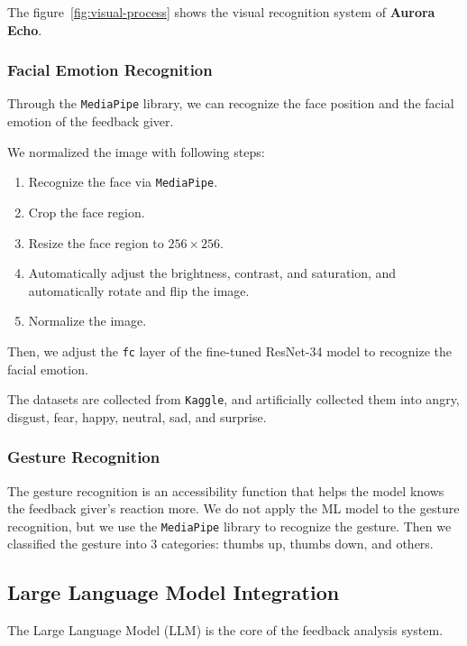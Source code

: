 \documentclass{article}
\begin{document}
    The figure~\ref{fig:visual-process} shows the visual recognition system of \textbf{Aurora Echo}.

    \subsubsection{Facial Emotion Recognition}

    Through the \texttt{MediaPipe} library, we can recognize the face position and the facial emotion of the feedback giver.

    We normalized the image with following steps:

    \begin{enumerate}
        \item Recognize the face via \texttt{MediaPipe}.
        \item Crop the face region.
        \item Resize the face region to $256 \times 256$.
        \item Automatically adjust the brightness, contrast, and saturation, and automatically rotate and flip the image.
        \item Normalize the image.
    \end{enumerate}

    Then, we adjust the \texttt{fc} layer of the fine-tuned ResNet-34 model to recognize the facial emotion.

    The datasets are collected from \texttt{Kaggle}\cite{tapakah68_2023,kapadnis_2024}, and artificially collected them into angry, disgust, fear, happy, neutral, sad, and surprise.

    \subsubsection{Gesture Recognition}

    The gesture recognition is an accessibility function that helps the model knows the feedback giver's reaction more.
    We do not apply the ML model to the gesture recognition, but we use the \texttt{MediaPipe} library to recognize the gesture.
    Then we classified the gesture into 3 categories: thumbs up, thumbs down, and others.

    \subsection{Large Language Model Integration}\label{subsec:llm}

    The Large Language Model (LLM) is the core of the feedback analysis system.
\end{document}
